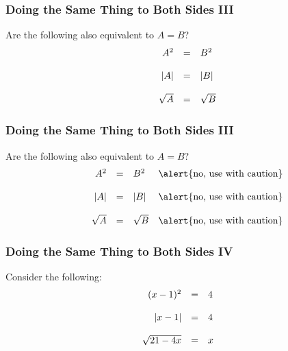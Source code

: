 \documentclass[xcolor=dvipsnames]{beamer}
\begin{document}
\begin{frame}
  \frametitle{Doing the Same Thing to Both Sides III}
Are the following also equivalent to $A=B$?
\begin{equation}
  \label{eq:uozingei}
  \begin{array}{rcl}
    A^{2}&=&B^{2} \\
\hspace{.5in} && \\
    |A|&=&|B| \\
\hspace{.5in} && \\
    \sqrt{A}&=&\sqrt{B}
  \end{array}
\end{equation}
\end{frame}

\begin{frame}
  \frametitle{Doing the Same Thing to Both Sides III}
Are the following also equivalent to $A=B$?
\begin{equation}
  \label{eq:upohngee}
  \begin{array}{rcll}
    A^{2}&=&B^{2}&\alert{\mbox{no, use with caution}} \\
\hspace{.5in} &&& \\
    |A|&=&|B|&\alert{\mbox{no, use with caution}} \\
\hspace{.5in} &&& \\
    \sqrt{A}&=&\sqrt{B}&\alert{\mbox{no, use with caution}}
  \end{array}
\end{equation}
\end{frame}

\begin{frame}
  \frametitle{Doing the Same Thing to Both Sides IV}
Consider the following:
\begin{equation}
  \label{eq:oopiesho}
  \begin{array}{rcl}
    (x-1)^{2}&=&4 \\
\hspace{.5in} && \\
    |x-1|&=&4 \\
\hspace{.5in} && \\
    \sqrt{21-4x}&=&x
  \end{array}
\end{equation}
\end{frame}
\end{document}
